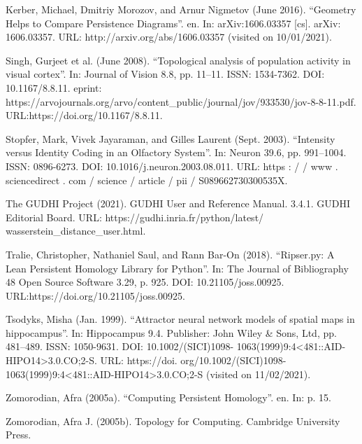 \documentclass[9pt,conference]{IEEEtran}
\begin{document}
\begin{thebibliography}{1}
Kerber, Michael, Dmitriy Morozov, and Arnur Nigmetov (June 2016). “Geometry Helps to Compare Persistence Diagrams”. en. In: arXiv:1606.03357 [cs]. arXiv: 1606.03357. URL: http://arxiv.org/abs/1606.03357 (visited on 10/01/2021).

Singh, Gurjeet et al. (June 2008). “Topological analysis of population activity in visual cortex”. In: Journal of Vision 8.8, pp. 11–11. ISSN: 1534-7362. DOI: 10.1167/8.8.11. eprint: https://arvojournals.org/arvo/content\_public/journal/jov/933530/jov-8-8-11.pdf. URL:https://doi.org/10.1167/8.8.11.

Stopfer, Mark, Vivek Jayaraman, and Gilles Laurent (Sept. 2003). “Intensity versus Identity Coding in an Olfactory System”. In: Neuron 39.6, pp. 991–1004. ISSN: 0896-6273. DOI: 10.1016/j.neuron.2003.08.011. URL: https : / / www . sciencedirect . com / science / article / pii / S089662730300535X.

The GUDHI Project (2021). GUDHI User and Reference Manual. 3.4.1. GUDHI
Editorial Board. URL: https://gudhi.inria.fr/python/latest/
wasserstein\_distance\_user.html.

Tralie, Christopher, Nathaniel Saul, and Rann Bar-On (2018). “Ripser.py: A Lean Persistent Homology Library for Python”. In: The Journal of Bibliography 48 Open Source Software 3.29, p. 925. DOI: 10.21105/joss.00925. URL:https://doi.org/10.21105/joss.00925.

Tsodyks, Misha (Jan. 1999). “Attractor neural network models of spatial maps in hippocampus”. In: Hippocampus 9.4. Publisher: John Wiley & Sons, Ltd, pp. 481–489. ISSN: 1050-9631. DOI: 10.1002/(SICI)1098- 1063(1999)9:4<481::AID-HIPO14>3.0.CO;2-S. URL: https://doi. org/10.1002/(SICI)1098-1063(1999)9:4<481::AID-HIPO14>3.0.CO;2-S (visited on 11/02/2021).

Zomorodian, Afra (2005a). “Computing Persistent Homology”. en. In:
p. 15.

Zomorodian, Afra J. (2005b). Topology for Computing. Cambridge University
Press.

\end{thebibliography}




\end{document}
